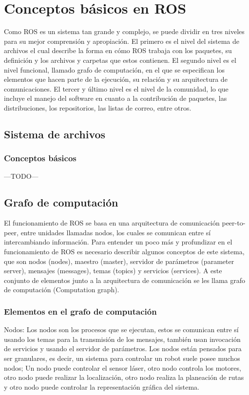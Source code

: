 \chapter{Conceptos básicos en ROS}

Como ROS es un sistema tan grande y complejo, se puede dividir en tres niveles para su mejor comprensión y apropiación. El primero es el nivel del sistema de archivos el cual describe la forma en cómo ROS trabaja con los paquetes, su definición y  los archivos y carpetas que estos contienen. El segundo nivel es el nivel funcional, llamado grafo de computación, en el que se especifican los elementos que hacen parte de la ejecución, su relación y su arquitectura de comunicaciones. El tercer y último nivel es el nivel de la comunidad, lo que incluye el manejo del software en cuanto a la contribución de paquetes, las distribuciones, los repositorios, las listas de correo, entre otros.

\section{Sistema de archivos}
\subsection{Conceptos básicos}
---TODO---
\section{Grafo de computación}

El funcionamiento de ROS se basa en una arquitectura de comunicación peer-to-peer, entre unidades llamadas nodos,  los cuales se comunican entre sí intercambiando información. Para entender un poco más y profundizar en el funcionamiento de ROS es necesario describir algunos conceptos de este sistema, que son nodos (nodes), maestro (master), servidor de parámetros (parameter server), mensajes (messages), temas (topics) y servicios (services). A este conjunto de elementos junto a la arquitectura de comunicación se les llama grafo de computación  (Computation graph).

\subsection{Elementos en el grafo de computación}

Nodos:
Los nodos son los procesos que se ejecutan, estos se comunican entre sí usando los temas para la transmisión de los mensajes, también usan invocación de servicios y usando el servidor de parámetros. Los nodos están pensados para ser granulares, es decir, un sistema para controlar un robot suele posee muchos nodos; Un nodo puede controlar el sensor láser, otro nodo controla los motores, otro nodo puede realizar la localización, otro nodo realiza la planeación de rutas y otro nodo puede controlar la representación gráfica del sistema.

